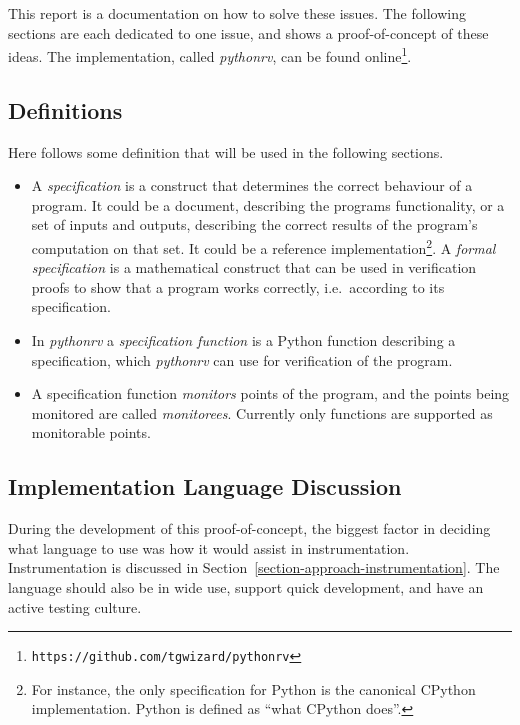 \documentclass[a4paper,11pt]{kth-mag}
\begin{document}
This report is a documentation on how to solve these issues. The following
sections are each dedicated to one issue, and shows a proof-of-concept of these
ideas. The implementation, called \textit{pythonrv}, can be found
online\footnote{\texttt{https://github.com/tgwizard/pythonrv}}.


\subsection{Definitions}

Here follows some definition that will be used in the following sections.

\begin{itemize}
  \item A \textit{specification} is a construct that determines the correct
    behaviour of a program. It could be a document, describing the programs
		functionality, or a set of inputs and outputs, describing the correct
		results of the program's computation on that set. It could be a reference
		implementation\footnote{For instance, the only specification for Python is
		the canonical CPython implementation. Python is defined as ``what CPython
		does''.}. A \textit{formal specification} is a mathematical construct that
		can be used in verification proofs to show that a program works correctly,
		i.e.\ according to its specification.

	\item In \textit{pythonrv} a \textit{specification function} is a Python
		function describing a specification, which \textit{pythonrv} can use for
		verification of the program.

  \item A specification function \textit{monitors} points of the program, and
    the points being monitored are called \textit{monitorees}. Currently only
    functions are supported as monitorable points.
\end{itemize}


\subsection{Implementation Language Discussion}

During the development of this proof-of-concept, the biggest factor in deciding
what language to use was how it would assist in instrumentation.
Instrumentation is discussed in Section~\ref{section-approach-instrumentation}.
The language should also be in wide use, support quick development, and have an
active testing culture.
\end{document}
